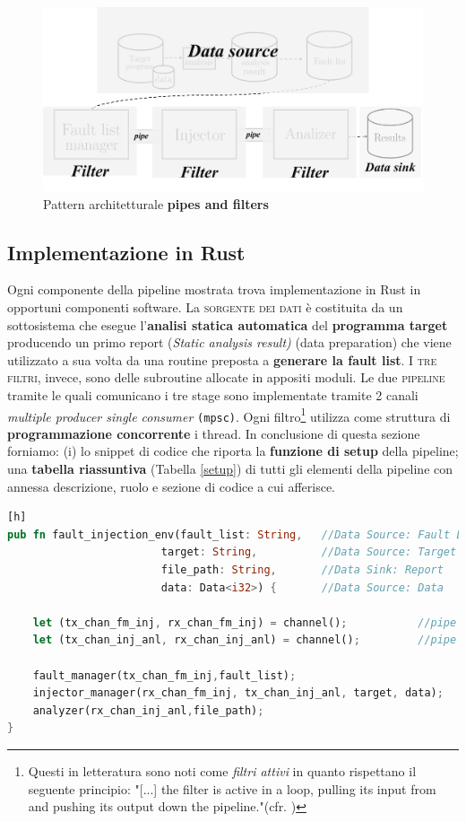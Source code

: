 \begin{figure}[h]
    \centering
    \includegraphics[scale=0.5]{img/pipeline_mapped.png}
    \caption{Pattern architetturale \textbf{pipes and filters}}
\end{figure}

\subsection{Implementazione in Rust}
Ogni componente della pipeline mostrata trova implementazione in Rust in opportuni componenti software. La \textsc{sorgente dei dati} è costituita da un sottosistema che esegue l'\textbf{analisi statica automatica} del \textbf{programma target} producendo un primo report (\textit{Static analysis result)} (data preparation) che viene utilizzato a sua volta da una routine preposta a \textbf{generare la fault list}. I \textsc{tre filtri}, invece, sono delle subroutine allocate in appositi moduli. Le due \textsc{pipeline} tramite le quali comunicano i tre stage sono implementate tramite 2 canali \textit{multiple producer single consumer} \texttt{(mpsc)}. Ogni filtro\footnote{
    Questi in letteratura sono noti come \textit{filtri attivi} in quanto rispettano il seguente principio: "[...] the filter is active in a loop, pulling its input from
    and pushing its output down the pipeline."(cfr. \cite{schmidt2013pattern})
} utilizza come struttura di \textbf{programmazione concorrente} i thread.
In conclusione di questa sezione forniamo: (i) lo snippet di codice che riporta la \textbf{funzione di setup} della pipeline; una \textbf{tabella riassuntiva} (Tabella \ref{setup}) di tutti gli elementi della pipeline con annessa descrizione, ruolo e sezione di codice a cui afferisce.\newpage

\begin{lstlisting}[language=rust, style=boxed][h]
pub fn fault_injection_env(fault_list: String,   //Data Source: Fault List
                        target: String,          //Data Source: Target program
                        file_path: String,       //Data Sink: Report
                        data: Data<i32>) {       //Data Source: Data

    let (tx_chan_fm_inj, rx_chan_fm_inj) = channel();           //pipe FLM-FIM
    let (tx_chan_inj_anl, rx_chan_inj_anl) = channel();         //pipe FIM-Analyzer

    fault_manager(tx_chan_fm_inj,fault_list);
    injector_manager(rx_chan_fm_inj, tx_chan_inj_anl, target, data);
    analyzer(rx_chan_inj_anl,file_path);
}
\end{lstlisting}

